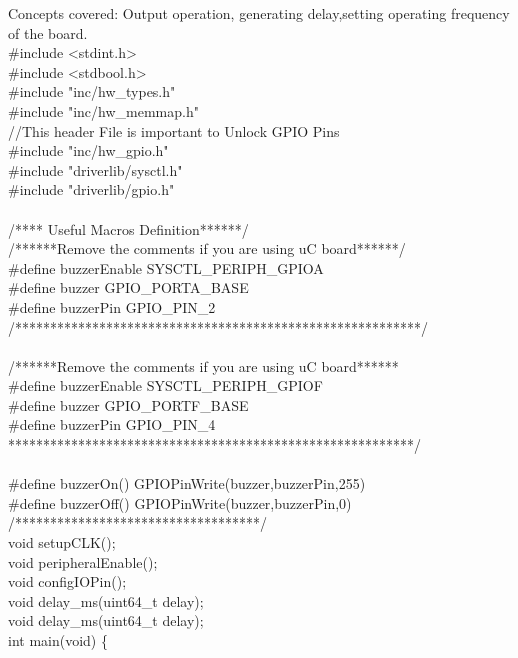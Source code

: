 \documentclass[a4paper,10pt,oneside]{article}
\begin{document}
			Concepts covered:
			Output operation, generating delay,setting operating frequency of the board.\\
			\#include <stdint.h>\\
			\#include <stdbool.h>\\
			\#include "inc/hw\_types.h"\\
			\#include "inc/hw\_memmap.h"\\
			//This header File is important to Unlock GPIO Pins\\
			\#include "inc/hw\_gpio.h"\\
			\#include "driverlib/sysctl.h"\\
			\#include "driverlib/gpio.h"\\
			\\
			/**** Useful Macros Definition******/\\
			/******Remove the comments if you are using uC board******/\\
			\#define buzzerEnable    SYSCTL\_PERIPH\_GPIOA\\
			\#define buzzer          GPIO\_PORTA\_BASE\\
			\#define buzzerPin       GPIO\_PIN\_2\\
			/**********************************************************/\\
			\\
			/******Remove the comments if you are using uC board******\\
			\#define buzzerEnable    SYSCTL\_PERIPH\_GPIOF\\
			\#define buzzer          GPIO\_PORTF\_BASE\\
			\#define buzzerPin       GPIO\_PIN\_4\\
			**********************************************************/\\
			\\
			\#define buzzerOn()      GPIOPinWrite(buzzer,buzzerPin,255)\\
			\#define buzzerOff()     GPIOPinWrite(buzzer,buzzerPin,0)\\
			/***********************************/\\
			void setupCLK();\\
			void peripheralEnable();\\
			void configIOPin();\\
			void delay\_ms(uint64\_t delay);\\
			void delay\_ms(uint64\_t delay);\\
			int main(void) \{\\
\end{document}
